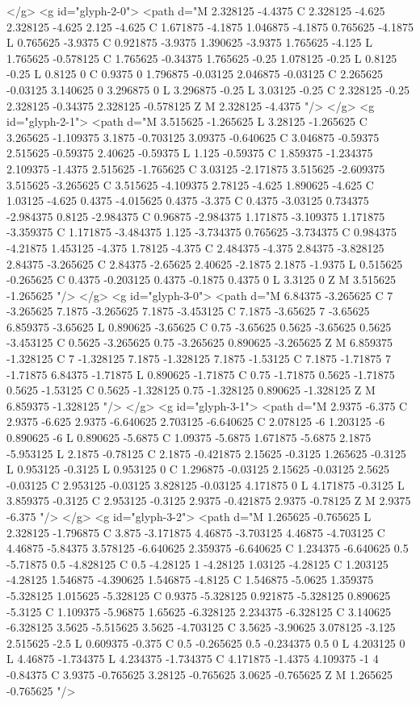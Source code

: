 </g>
<g id="glyph-2-0">
<path d="M 2.328125 -4.4375 C 2.328125 -4.625 2.328125 -4.625 2.125 -4.625 C 1.671875 -4.1875 1.046875 -4.1875 0.765625 -4.1875 L 0.765625 -3.9375 C 0.921875 -3.9375 1.390625 -3.9375 1.765625 -4.125 L 1.765625 -0.578125 C 1.765625 -0.34375 1.765625 -0.25 1.078125 -0.25 L 0.8125 -0.25 L 0.8125 0 C 0.9375 0 1.796875 -0.03125 2.046875 -0.03125 C 2.265625 -0.03125 3.140625 0 3.296875 0 L 3.296875 -0.25 L 3.03125 -0.25 C 2.328125 -0.25 2.328125 -0.34375 2.328125 -0.578125 Z M 2.328125 -4.4375 "/>
</g>
<g id="glyph-2-1">
<path d="M 3.515625 -1.265625 L 3.28125 -1.265625 C 3.265625 -1.109375 3.1875 -0.703125 3.09375 -0.640625 C 3.046875 -0.59375 2.515625 -0.59375 2.40625 -0.59375 L 1.125 -0.59375 C 1.859375 -1.234375 2.109375 -1.4375 2.515625 -1.765625 C 3.03125 -2.171875 3.515625 -2.609375 3.515625 -3.265625 C 3.515625 -4.109375 2.78125 -4.625 1.890625 -4.625 C 1.03125 -4.625 0.4375 -4.015625 0.4375 -3.375 C 0.4375 -3.03125 0.734375 -2.984375 0.8125 -2.984375 C 0.96875 -2.984375 1.171875 -3.109375 1.171875 -3.359375 C 1.171875 -3.484375 1.125 -3.734375 0.765625 -3.734375 C 0.984375 -4.21875 1.453125 -4.375 1.78125 -4.375 C 2.484375 -4.375 2.84375 -3.828125 2.84375 -3.265625 C 2.84375 -2.65625 2.40625 -2.1875 2.1875 -1.9375 L 0.515625 -0.265625 C 0.4375 -0.203125 0.4375 -0.1875 0.4375 0 L 3.3125 0 Z M 3.515625 -1.265625 "/>
</g>
<g id="glyph-3-0">
<path d="M 6.84375 -3.265625 C 7 -3.265625 7.1875 -3.265625 7.1875 -3.453125 C 7.1875 -3.65625 7 -3.65625 6.859375 -3.65625 L 0.890625 -3.65625 C 0.75 -3.65625 0.5625 -3.65625 0.5625 -3.453125 C 0.5625 -3.265625 0.75 -3.265625 0.890625 -3.265625 Z M 6.859375 -1.328125 C 7 -1.328125 7.1875 -1.328125 7.1875 -1.53125 C 7.1875 -1.71875 7 -1.71875 6.84375 -1.71875 L 0.890625 -1.71875 C 0.75 -1.71875 0.5625 -1.71875 0.5625 -1.53125 C 0.5625 -1.328125 0.75 -1.328125 0.890625 -1.328125 Z M 6.859375 -1.328125 "/>
</g>
<g id="glyph-3-1">
<path d="M 2.9375 -6.375 C 2.9375 -6.625 2.9375 -6.640625 2.703125 -6.640625 C 2.078125 -6 1.203125 -6 0.890625 -6 L 0.890625 -5.6875 C 1.09375 -5.6875 1.671875 -5.6875 2.1875 -5.953125 L 2.1875 -0.78125 C 2.1875 -0.421875 2.15625 -0.3125 1.265625 -0.3125 L 0.953125 -0.3125 L 0.953125 0 C 1.296875 -0.03125 2.15625 -0.03125 2.5625 -0.03125 C 2.953125 -0.03125 3.828125 -0.03125 4.171875 0 L 4.171875 -0.3125 L 3.859375 -0.3125 C 2.953125 -0.3125 2.9375 -0.421875 2.9375 -0.78125 Z M 2.9375 -6.375 "/>
</g>
<g id="glyph-3-2">
<path d="M 1.265625 -0.765625 L 2.328125 -1.796875 C 3.875 -3.171875 4.46875 -3.703125 4.46875 -4.703125 C 4.46875 -5.84375 3.578125 -6.640625 2.359375 -6.640625 C 1.234375 -6.640625 0.5 -5.71875 0.5 -4.828125 C 0.5 -4.28125 1 -4.28125 1.03125 -4.28125 C 1.203125 -4.28125 1.546875 -4.390625 1.546875 -4.8125 C 1.546875 -5.0625 1.359375 -5.328125 1.015625 -5.328125 C 0.9375 -5.328125 0.921875 -5.328125 0.890625 -5.3125 C 1.109375 -5.96875 1.65625 -6.328125 2.234375 -6.328125 C 3.140625 -6.328125 3.5625 -5.515625 3.5625 -4.703125 C 3.5625 -3.90625 3.078125 -3.125 2.515625 -2.5 L 0.609375 -0.375 C 0.5 -0.265625 0.5 -0.234375 0.5 0 L 4.203125 0 L 4.46875 -1.734375 L 4.234375 -1.734375 C 4.171875 -1.4375 4.109375 -1 4 -0.84375 C 3.9375 -0.765625 3.28125 -0.765625 3.0625 -0.765625 Z M 1.265625 -0.765625 "/>
